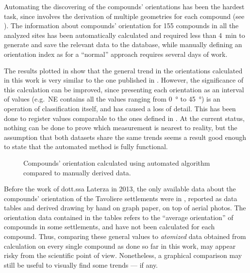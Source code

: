             Automating the discovering of the compounds' orientations has been the hardest task, since involves the derivation of multiple geometries for each compound (see ).
            The information about compounds' orientation for 155 compounds in all the analyzed sites has been automatically calculated and required less than \SI{4}{\minute} to generate and save the relevant data to the database, while manually defining an orientation index as for a ``normal'' approach requires several days of work.
            
            The results plotted in  show that the general trend in the orientations calculated in this work is very similar to the one published in \cite{laterza}. However, the significance of this calculation can be improved, since presenting each orientation as an interval of values (e.g.\ NE contains all the values ranging from \SI{0}{\degree} to \SI{45}{\degree}) is an operation of classification itself, and has caused a loss of detail. This has been done to register values comparable to the ones defined in \cite{laterza}. At the current status, nothing can be done to prove which measurement is nearest to reality, but the assumption that both datasets share the same trends seems a result good enough to state that the automated method is fully functional.

            \begin{figure}[H]
                \centering
                \begin{tikzpicture}
                    
                \end{tikzpicture}
                \caption[Orientation of compounds for all the settlements calculated in this work compared with know data.]{Compounds' orientation calculated using automated algorithm compared to manually derived data.}
                \label{fig:graph-orient}
            \end{figure}

            Before the work of dott.ssa Laterza in 2013, the only available data about the compounds' orientation of the Tavoliere settlements were in \textcite[appx.~IV]{jones-tavoliere}, reported as data tables and derived drawing by hand on graph paper, on top of aerial photos. The orientation data contained in the tables refers to the ``average orientation'' of compounds in some settlements, and have not been calculated for each compound. Thus, comparing these general values to \emph{atomized} data obtained from calculation on every single compound as done so far in this work, may appear risky from the scientific point of view. Nonetheless, a graphical comparison may still be useful to visually find some trends --- if any. 


